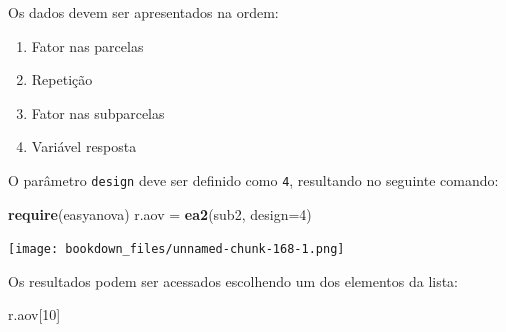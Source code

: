 \documentclass[
]{article}
\newenvironment{Shaded}{\begin{snugshade}}{\end{snugshade}}
\newcommand{\DataTypeTok}[1]{\textcolor[rgb]{0.13,0.29,0.53}{#1}}
\newcommand{\DecValTok}[1]{\textcolor[rgb]{0.00,0.00,0.81}{#1}}
\newcommand{\KeywordTok}[1]{\textcolor[rgb]{0.13,0.29,0.53}{\textbf{#1}}}
\newcommand{\NormalTok}[1]{#1}
\newcommand{\StringTok}[1]{\textcolor[rgb]{0.31,0.60,0.02}{#1}}
\providecommand{\tightlist}{%
  \setlength{\itemsep}{0pt}\setlength{\parskip}{0pt}}
\begin{document}
Os dados devem ser apresentados na ordem:

\begin{enumerate}
\def\labelenumi{\arabic{enumi}.}
\tightlist
\item
  Fator nas parcelas
\item
  Repetição
\item
  Fator nas subparcelas
\item
  Variável resposta
\end{enumerate}

O parâmetro \texttt{design} deve ser definido como \texttt{4}, resultando no seguinte comando:

\begin{Shaded}
\begin{Highlighting}[]
\KeywordTok{require}\NormalTok{(easyanova)}
\NormalTok{r.aov =}\StringTok{ }\KeywordTok{ea2}\NormalTok{(sub2, }\DataTypeTok{design=}\DecValTok{4}\NormalTok{)}
\end{Highlighting}
\end{Shaded}

\texttt{[image: bookdown\_files/unnamed-chunk-168-1.png]}

Os resultados podem ser acessados escolhendo um dos elementos da lista:

\begin{Shaded}
\begin{Highlighting}[]
\NormalTok{r.aov[}\DecValTok{10}\NormalTok{]}
\end{Highlighting}
\end{Shaded}
\end{document}
